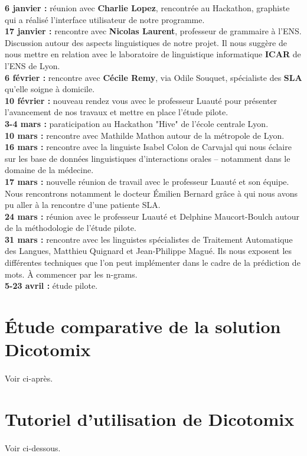 \documentclass[11pt,a4paper]{article}
\theoremstyle{plain}
\theoremstyle{definition}
\begin{document}
\textbf{6 janvier : } réunion avec \textbf{Charlie Lopez}, rencontrée au Hackathon, graphiste qui a réalisé l'interface utilisateur de notre programme. \\

\textbf{17 janvier : } rencontre avec \textbf{Nicolas Laurent}, professeur de grammaire à l'ENS. Discussion autour des aspects linguistiques de notre projet. Il nous suggère de nous mettre en relation avec le laboratoire de linguistique informatique \textbf{ICAR} de l'ENS de Lyon. \\

\textbf{6 février : } rencontre avec \textbf{Cécile Remy}, via Odile Souquet, spécialiste des \textbf{SLA} qu'elle soigne à domicile. \\

\textbf{10 février : } nouveau rendez vous avec le professeur Luauté pour présenter l'avancement de nos travaux et mettre en place l'étude pilote. \\

\textbf{3-4 mars : } paraticipation au Hackathon "Hive" de l'école centrale Lyon. \\

\textbf{10 mars : } rencontre avec Mathilde Mathon autour de la métropole de Lyon. \\

\textbf{16 mars : } rencontre avec la linguiste Isabel Colon de Carvajal qui nous éclaire sur les base de données linguistiques d'interactions orales -- notamment dans le domaine de la médecine. \\

\textbf{17 mars : } nouvelle réunion de travail avec le professeur Luauté et son équipe. Nous rencontrons notamment le docteur Émilien Bernard grâce à qui nous avons pu aller à la rencontre d'une patiente SLA. \\

\textbf{24 mars : } réunion avec le professeur Luauté et Delphine Maucort-Boulch autour de la méthodologie de l'étude pilote. \\

\textbf{31 mars : } rencontre avec les linguistes spécialistes de Traitement Automatique des Langues, Matthieu Quignard et Jean-Philippe Magué. Ils nous exposent les différentes techniques que l'on peut implémenter dans le cadre de la prédiction de mots. À commencer par les n-grams.\\

\textbf{5-23 avril : } étude pilote. \\
    

\section{Étude comparative de la solution Dicotomix}
\paragraph{} Voir ci-après.
\section{Tutoriel d'utilisation de Dicotomix}
\paragraph{} Voir ci-dessous.



\end{document}
